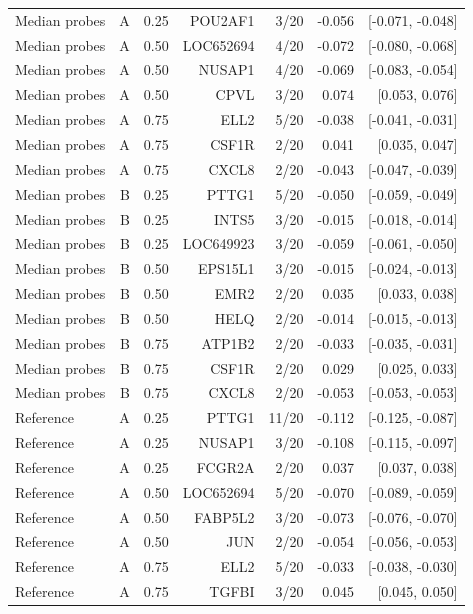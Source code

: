 \begin{longtable}{lrrrrrr}
Median probes & A & 0.25 & POU2AF1 & 3/20 & -0.056 & [-0.071, -0.048] \\
Median probes & A & 0.50 & LOC652694 & 4/20 & -0.072 & [-0.080, -0.068] \\
Median probes & A & 0.50 & NUSAP1 & 4/20 & -0.069 & [-0.083, -0.054] \\
Median probes & A & 0.50 & CPVL & 3/20 & 0.074 & [0.053, 0.076] \\
Median probes & A & 0.75 & ELL2 & 5/20 & -0.038 & [-0.041, -0.031] \\
Median probes & A & 0.75 & CSF1R & 2/20 & 0.041 & [0.035, 0.047] \\
Median probes & A & 0.75 & CXCL8 & 2/20 & -0.043 & [-0.047, -0.039] \\
Median probes & B & 0.25 & PTTG1 & 5/20 & -0.050 & [-0.059, -0.049] \\
Median probes & B & 0.25 & INTS5 & 3/20 & -0.015 & [-0.018, -0.014] \\
Median probes & B & 0.25 & LOC649923 & 3/20 & -0.059 & [-0.061, -0.050] \\
Median probes & B & 0.50 & EPS15L1 & 3/20 & -0.015 & [-0.024, -0.013] \\
Median probes & B & 0.50 & EMR2 & 2/20 & 0.035 & [0.033, 0.038] \\
Median probes & B & 0.50 & HELQ & 2/20 & -0.014 & [-0.015, -0.013] \\
Median probes & B & 0.75 & ATP1B2 & 2/20 & -0.033 & [-0.035, -0.031] \\
Median probes & B & 0.75 & CSF1R & 2/20 & 0.029 & [0.025, 0.033] \\
Median probes & B & 0.75 & CXCL8 & 2/20 & -0.053 & [-0.053, -0.053] \\
Reference & A & 0.25 & PTTG1 & 11/20 & -0.112 & [-0.125, -0.087] \\
Reference & A & 0.25 & NUSAP1 & 3/20 & -0.108 & [-0.115, -0.097] \\
Reference & A & 0.25 & FCGR2A & 2/20 & 0.037 & [0.037, 0.038] \\
Reference & A & 0.50 & LOC652694 & 5/20 & -0.070 & [-0.089, -0.059] \\
Reference & A & 0.50 & FABP5L2 & 3/20 & -0.073 & [-0.076, -0.070] \\
Reference & A & 0.50 & JUN & 2/20 & -0.054 & [-0.056, -0.053] \\
Reference & A & 0.75 & ELL2 & 5/20 & -0.033 & [-0.038, -0.030] \\
Reference & A & 0.75 & TGFBI & 3/20 & 0.045 & [0.045, 0.050] \\

\end{longtable}
